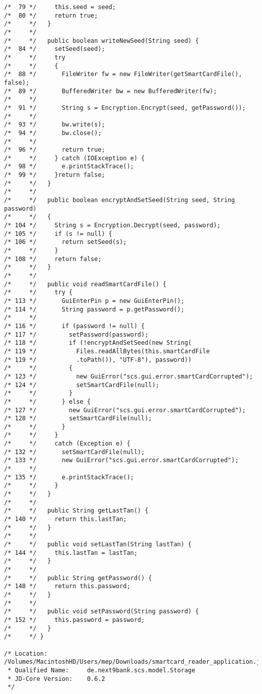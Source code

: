 \begin{lstlisting}
/*  79 */     this.seed = seed;
/*  80 */     return true;
/*     */   }
/*     */ 
/*     */   public boolean writeNewSeed(String seed) {
/*  84 */     setSeed(seed);
/*     */     try
/*     */     {
/*  88 */       FileWriter fw = new FileWriter(getSmartCardFile(), false);
/*  89 */       BufferedWriter bw = new BufferedWriter(fw);
/*     */ 
/*  91 */       String s = Encryption.Encrypt(seed, getPassword());
/*     */ 
/*  93 */       bw.write(s);
/*  94 */       bw.close();
/*     */ 
/*  96 */       return true;
/*     */     } catch (IOException e) {
/*  98 */       e.printStackTrace();
/*  99 */     }return false;
/*     */   }
/*     */ 
/*     */   public boolean encryptAndSetSeed(String seed, String password)
/*     */   {
/* 104 */     String s = Encryption.Decrypt(seed, password);
/* 105 */     if (s != null) {
/* 106 */       return setSeed(s);
/*     */     }
/* 108 */     return false;
/*     */   }
/*     */ 
/*     */   public void readSmartCardFile() {
/*     */     try {
/* 113 */       GuiEnterPin p = new GuiEnterPin();
/* 114 */       String password = p.getPassword();
/*     */ 
/* 116 */       if (password != null) {
/* 117 */         setPassword(password);
/* 118 */         if (!encryptAndSetSeed(new String(
/* 119 */           Files.readAllBytes(this.smartCardFile
/* 119 */           .toPath()), "UTF-8"), password))
/*     */         {
/* 123 */           new GuiError("scs.gui.error.smartCardCorrupted");
/* 124 */           setSmartCardFile(null);
/*     */         }
/*     */       } else {
/* 127 */         new GuiError("scs.gui.error.smartCardCorrupted");
/* 128 */         setSmartCardFile(null);
/*     */       }
/*     */     }
/*     */     catch (Exception e) {
/* 132 */       setSmartCardFile(null);
/* 133 */       new GuiError("scs.gui.error.smartCardCorrupted");
/*     */ 
/* 135 */       e.printStackTrace();
/*     */     }
/*     */   }
/*     */ 
/*     */   public String getLastTan() {
/* 140 */     return this.lastTan;
/*     */   }
/*     */ 
/*     */   public void setLastTan(String lastTan) {
/* 144 */     this.lastTan = lastTan;
/*     */   }
/*     */ 
/*     */   public String getPassword() {
/* 148 */     return this.password;
/*     */   }
/*     */ 
/*     */   public void setPassword(String password) {
/* 152 */     this.password = password;
/*     */   }
/*     */ }

/* Location:           /Volumes/MacintoshHD/Users/mep/Downloads/smartcard_reader_application.jar
 * Qualified Name:     de.next9bank.scs.model.Storage
 * JD-Core Version:    0.6.2
 */
\end{lstlisting}

